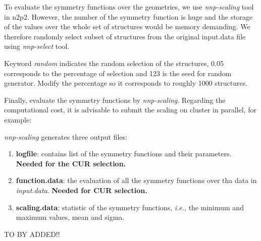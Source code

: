 \documentclass[12pt]{article}
\begin{document}
To evaluate the symmetry functions over the geometries, we use \textit{nnp-scaling} tool in n2p2. However, the number of the symmetry function is huge and the storage of the values over the whole set of structures would be memory demanding. We therefore randomly select subset of structures from the original input.data file using \textit{nnp-select} tool.

\begin{center}
\end{center}

Keyword \textit{random} indicates the random selection of the structures, 0.05 corresponds to the percentage of selection and 123 is the seed for random generator. Modify the percentage so it corresponds to roughly 1000 structures.

Finally, evaluate the symmetry functions by \textit{nnp-scaling}. Regarding the computational cost, it is advisable to submit the scaling on cluster in parallel, for example:

\begin{center}
\end{center}


\textit{nnp-scaling} generates three output files:
\begin{enumerate}
    \item \textbf{logfile}: contains list of the symmetry functions and their parameters. \textbf{Needed for the CUR selection.}
    \item \textbf{function.data}: the evaluation of all the symmetry functions over tha data in \textit{input.data}. \textbf{Needed for CUR selection.}
    \item \textbf{scaling.data}: statistic of the symmetry functions, \textit{i.e.}, the minimum and maximum values, mean and sigma.
\end{enumerate}

TO BY ADDED!!
\end{document}
